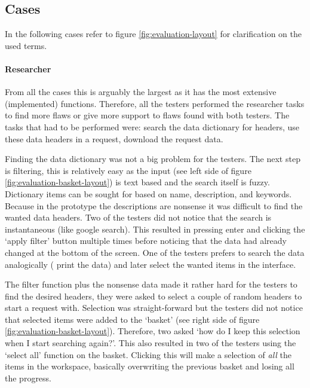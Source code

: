 \subsection{Cases}
\label{evaluation-cases}

In the following cases refer to figure \ref{fig:evaluation-layout} for clarification on the used terms.

\paragraph{Researcher}
From all the cases this is arguably the largest as it has the most extensive (implemented) functions.
Therefore, all the testers performed the researcher tasks to find more flaws or give more support to flaws found with both testers.
The tasks that had to be performed were: search the data dictionary for headers, use these data headers in a request, download the request data.


Finding the data dictionary was not a big problem for the testers.
The next step is filtering, this is relatively easy as the input (see left side of figure \ref{fig:evaluation-basket-layout}) is text based and the search itself is fuzzy.
Dictionary items can be sought for based on name, description, and keywords.
Because in the prototype the descriptions are nonsense it was difficult to find the wanted data headers.
Two of the testers did not notice that the search is instantaneous (like google search).
This resulted in pressing enter and clicking the `apply filter' button multiple times before noticing that the data had already changed at the bottom of the screen.
One of the testers prefers to search the data analogically (\ie{} print the data) and later select the wanted items in the interface.

The filter function plus the nonsense data made it rather hard for the testers to find the desired headers, they were asked to select a couple of random headers to start a request with.
Selection was straight-forward but the testers did not notice that selected items were added to the `basket' (see right side of figure \ref{fig:evaluation-basket-layout}).
Therefore, two asked `how do I keep this selection when I start searching again?'.
This also resulted in two of the testers using the `select all' function on the basket. 
Clicking this will make a selection of \emph{all} the items in the workspace, basically overwriting the previous basket and losing all the progress.

